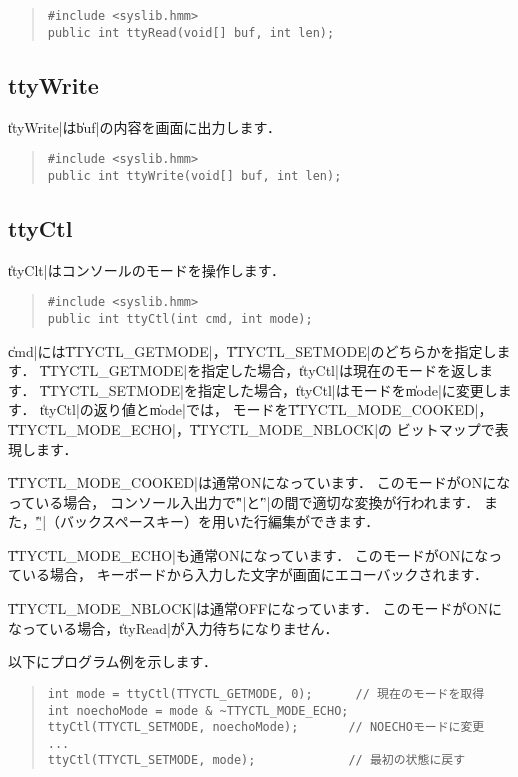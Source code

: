 \begin{quote}
\begin{verbatim}
#include <syslib.hmm>
public int ttyRead(void[] buf, int len);
\end{verbatim}
\end{quote}

\subsection{ttyWrite}

\|ttyWrite|は\|buf|の内容を画面に出力します．

\begin{quote}
\begin{verbatim}
#include <syslib.hmm>
public int ttyWrite(void[] buf, int len);
\end{verbatim}
\end{quote}

\subsection{ttyCtl}

\|ttyClt|はコンソールのモードを操作します．

\begin{quote}
\begin{verbatim}
#include <syslib.hmm>
public int ttyCtl(int cmd, int mode);
\end{verbatim}
\end{quote}

\|cmd|には\|TTYCTL_GETMODE|，\|TTYCTL_SETMODE|のどちらかを指定します．
\|TTYCTL_GETMODE|を指定した場合，\|ttyCtl|は現在のモードを返します．
\|TTYCTL_SETMODE|を指定した場合，\|ttyCtl|はモードを\|mode|に変更します．
\|ttyCtl|の返り値と\|mode|では，
モードを\|TTYCTL_MODE_COOKED|，\|TTYCTL_MODE_ECHO|，\|TTYCTL_MODE_NBLOCK|の
ビットマップで表現します．

\|TTYCTL_MODE_COOKED|は通常ONになっています．
このモードがONになっている場合，
コンソール入出力で\|'\r'|と\|'\n'|の間で適切な変換が行われます．
また，\|'\b'|（バックスペースキー）を用いた行編集ができます．

\|TTYCTL_MODE_ECHO|も通常ONになっています．
このモードがONになっている場合，
キーボードから入力した文字が画面にエコーバックされます．

\|TTYCTL_MODE_NBLOCK|は通常OFFになっています．
このモードがONになっている場合，\|ttyRead|が入力待ちになりません．

以下にプログラム例を示します．

\begin{quote}
\begin{verbatim}
int mode = ttyCtl(TTYCTL_GETMODE, 0);      // 現在のモードを取得
int noechoMode = mode & ~TTYCTL_MODE_ECHO;
ttyCtl(TTYCTL_SETMODE, noechoMode);       // NOECHOモードに変更
...
ttyCtl(TTYCTL_SETMODE, mode);             // 最初の状態に戻す
\end{verbatim}
\end{quote}
